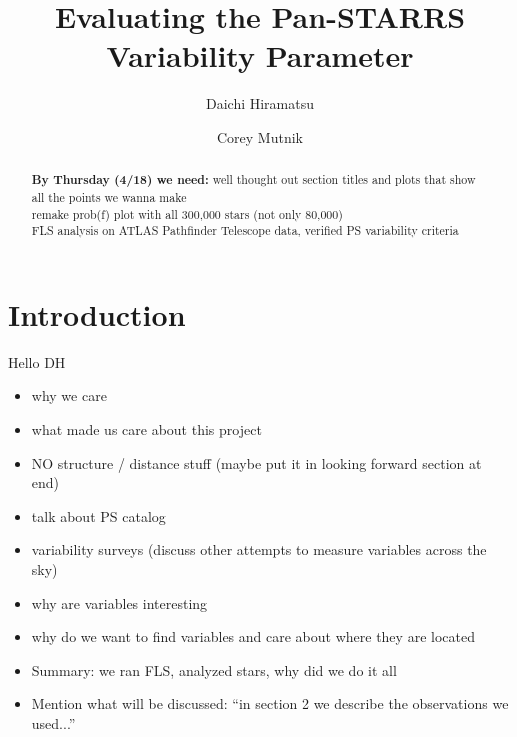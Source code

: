 \documentclass[aps,prb,twocolumn,superscriptaddress]{revtex4-1}
\begin{document}
\title{Evaluating the Pan-STARRS Variability Parameter}


%


\author{Daichi Hiramatsu}
\author{Corey Mutnik}



\begin{abstract}
\textbf{By Thursday (4/18) we need:} well thought out section titles and plots that show all the points we wanna make\\

remake prob(f) plot with all 300,000 stars (not only 80,000)\\

FLS analysis on ATLAS Pathfinder Telescope data, verified PS variability criteria
\end{abstract}

\maketitle    




\section{Introduction}
Hello DH~\cite{RRLyrae}
\begin{itemize}
	\item{} why we care
	\item{} what made us care about this project
	\item{} NO structure / distance stuff (maybe put it in looking forward section at end)
	\item{} talk about PS catalog
	\item{} variability surveys (discuss other attempts to measure variables across the sky)
	\item{} why are variables interesting
	\item{} why do we want to find variables and care about where they are located
	\item{} Summary: we ran FLS, analyzed stars, why did we do it all
	\item{} Mention what will be discussed: ``in section 2 we describe the observations we used...''
\end{itemize}
\end{document}
